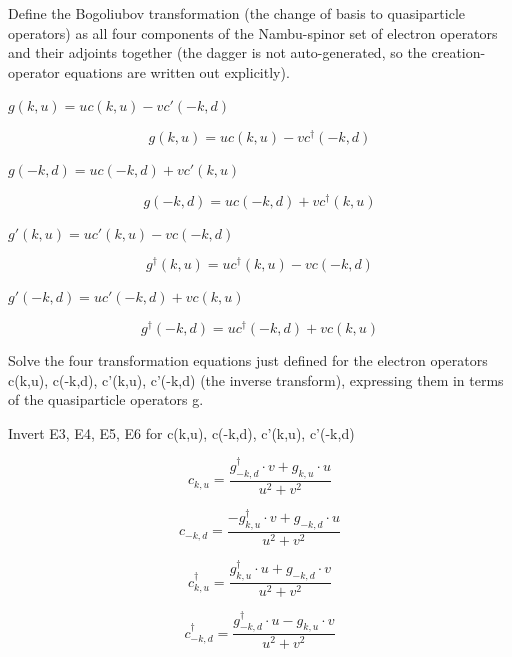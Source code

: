 \documentclass[dvipdfmx]{article}
\begin{document}
Define the Bogoliubov transformation (the change of basis to quasiparticle operators) as all four components of the Nambu-spinor set of electron operators and their adjoints together (the dagger is not auto-generated, so the creation-operator equations are written out explicitly).

$g(k,u) = u c(k,u) - v c'(-k,d)$

\begin{equation}
  g(k,u) = u c(k,u) - v c^{\dagger}(-k,d)
  \label{eq:E3}
\end{equation}

$g(-k,d) = u c(-k,d) + v c'(k,u)$

\begin{equation}
  g(-k,d) = u c(-k,d) + v c^{\dagger}(k,u)
  \label{eq:E4}
\end{equation}

$g'(k,u) = u c'(k,u) - v c(-k,d)$

\begin{equation}
  g^{\dagger}(k,u) = u c^{\dagger}(k,u) - v c(-k,d)
  \label{eq:E5}
\end{equation}

$g'(-k,d) = u c'(-k,d) + v c(k,u)$

\begin{equation}
  g^{\dagger}(-k,d) = u c^{\dagger}(-k,d) + v c(k,u)
  \label{eq:E6}
\end{equation}

Solve the four transformation equations just defined for the electron operators c(k,u), c(-k,d), c'(k,u), c'(-k,d) (the inverse transform), expressing them in terms of the quasiparticle operators g.

Invert E3, E4, E5, E6 for c(k,u), c(-k,d), c'(k,u), c'(-k,d)

\begin{equation}
  c_{k,u} = \frac{g^{\dagger}_{-k,d} \cdot v + g_{k,u} \cdot u}{u^{2} + v^{2}}
  \label{eq:E7}
\end{equation}

\begin{equation}
  c_{-k,d} = \frac{ - g^{\dagger}_{k,u} \cdot v + g_{-k,d} \cdot u}{u^{2} + v^{2}}
  \label{eq:E8}
\end{equation}

\begin{equation}
  c^{\dagger}_{k,u} = \frac{g^{\dagger}_{k,u} \cdot u + g_{-k,d} \cdot v}{u^{2} + v^{2}}
  \label{eq:E9}
\end{equation}

\begin{equation}
  c^{\dagger}_{-k,d} = \frac{g^{\dagger}_{-k,d} \cdot u - g_{k,u} \cdot v}{u^{2} + v^{2}}
  \label{eq:E10}
\end{equation}
\end{document}
